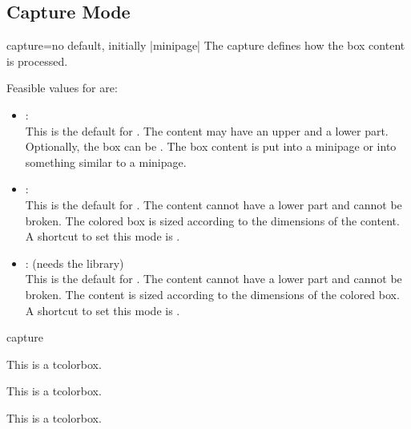 
{\tcbuselistingtext}


\clearpage
\subsection{Capture Mode}\label{subsec:capture}

\begin{docTcbKey}{capture}{=}{no default, initially |minipage|}
  The capture  defines how the box content is processed.

Feasible values for  are:
\begin{itemize}
\item{}:\\
  This is the default  for .
  The content may have an upper and a lower part. Optionally, the box
  can be . The box content is put into a
  minipage or into something similar to a minipage.
\item{}:\\
  This is the default  for . The content cannot have
  a lower part and cannot be broken. The colored box is sized according
  to the dimensions of the content.
  A shortcut to set this mode is .
\item{}: (needs the  library)\\
  This is the default  for . The content cannot have
  a lower part and cannot be broken.
  The content is sized according to the dimensions of the colored box.
  A shortcut to set this mode is .
\end{itemize}

\begin{exdispExample}{capture}

\begin{tcolorbox}[capture=minipage]
This is a tcolorbox.
\end{tcolorbox}

\begin{tcolorbox}[capture=hbox]
This is a tcolorbox.
\end{tcolorbox}

\begin{tcolorbox}[capture=fitbox,height=9mm]%
This is a tcolorbox.
\end{tcolorbox}
\end{exdispExample}
\end{docTcbKey}



